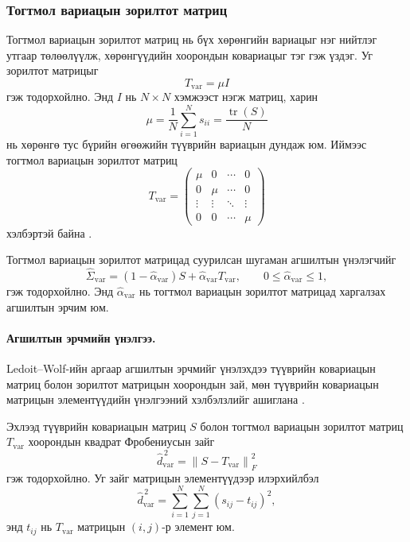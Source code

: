 \subsubsection{Тогтмол вариацын зорилтот матриц}

Тогтмол вариацын зорилтот матриц нь бүх хөрөнгийн вариацыг нэг нийтлэг утгаар төлөөлүүлж, хөрөнгүүдийн хоорондын ковариацыг тэг гэж үздэг. Уг зорилтот матрицыг
\[
T_{\mathrm{var}}
=
\mu I
\]
гэж тодорхойлно. Энд $I$ нь $N\times N$ хэмжээст нэгж матриц, харин
\[
\mu
=
\frac{1}{N}\sum_{i=1}^{N}s_{ii}
=
\frac{\operatorname{tr}(S)}{N}
\]
нь хөрөнгө тус бүрийн өгөөжийн түүврийн вариацын дундаж юм. Иймээс тогтмол вариацын зорилтот матриц
\[
T_{\mathrm{var}}
=
\begin{pmatrix}
	\mu & 0 & \cdots & 0\\
	0 & \mu & \cdots & 0\\
	\vdots & \vdots & \ddots & \vdots\\
	0 & 0 & \cdots & \mu
\end{pmatrix}
\]
хэлбэртэй байна \citep{ledoitwolf2004a}.

Тогтмол вариацын зорилтот матрицад суурилсан шугаман агшилтын үнэлэгчийг
\[
\widehat{\Sigma}_{\mathrm{var}}
=
(1-\widehat{\alpha}_{\mathrm{var}})S
+
\widehat{\alpha}_{\mathrm{var}}T_{\mathrm{var}},
\qquad
0\leq\widehat{\alpha}_{\mathrm{var}}\leq1,
\]
гэж тодорхойлно. Энд $\widehat{\alpha}_{\mathrm{var}}$ нь тогтмол вариацын зорилтот матрицад харгалзах агшилтын эрчим юм.


\paragraph{Агшилтын эрчмийн үнэлгээ.}

Ledoit--Wolf-ийн аргаар агшилтын эрчмийг үнэлэхдээ түүврийн ковариацын матриц болон зорилтот матрицын хоорондын зай, мөн түүврийн ковариацын матрицын элементүүдийн үнэлгээний хэлбэлзлийг ашиглана \citep{ledoitwolf2004a}.

Эхлээд түүврийн ковариацын матриц $S$ болон тогтмол вариацын зорилтот матриц $T_{\mathrm{var}}$ хоорондын квадрат Фробениусын зайг
\[
\widehat{d}_{\mathrm{var}}^{\,2}
=
\left\|
S-T_{\mathrm{var}}
\right\|_F^2
\]
гэж тодорхойлно. Уг зайг матрицын элементүүдээр илэрхийлбэл
\[
\widehat{d}_{\mathrm{var}}^{\,2}
=
\sum_{i=1}^{N}
\sum_{j=1}^{N}
(s_{ij}-t_{ij})^2,
\]
энд $t_{ij}$ нь $T_{\mathrm{var}}$ матрицын $(i,j)$-р элемент юм.

